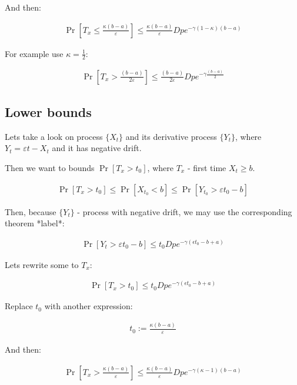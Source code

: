 \documentclass[12pt, a4paper]{article}
\theoremstyle{remark}
\begin{document}
And then:

\begin{align*}
    \Pr\left[T_x \leq \frac{\kappa (b - a)}{\varepsilon}\right] \leq \frac{\kappa (b - a)}{\varepsilon} D p e^{-\gamma(1 - \kappa)(b - a)}
\end{align*}

For example use $\kappa = \frac{1}{2}$:

\begin{align*}
    \Pr\left[T_x > \frac{(b - a)}{2\varepsilon}\right] \leq \frac{(b - a)}{2\varepsilon} D p e^{-\gamma\frac{(b - a)}{2}}
\end{align*}
\subsection{Lower bounds}
Lets take a look on process $\{X_t\}$ and its derivative process $\{Y_t\}$, where $Y_t = \varepsilon t - X_t$ and it has negative drift.

Then we want to bounds $\Pr[T_x > t_0]$, where $T_x$ - first time $X_t \geq b$. 

\begin{align*}
    \Pr[T_x > t_0] \leq \Pr[X_{t_0} < b] \leq \Pr[Y_{t_0} > \varepsilon t_0 - b]
\end{align*}

Then, because $\{Y_t\}$ - process with negative drift, we may use the corresponding theorem *label*:

\begin{align*}
    \Pr[Y_t > \varepsilon t_0 - b] \leq t_0 D p e^{-\gamma(\epsilon t_0 - b + a)}
\end{align*}

Lets rewrite some to $T_x$: 

\begin{align*}
    \Pr[T_x > t_0] \leq t_0 D p e^{-\gamma(\epsilon t_0 - b + a)}
\end{align*}

Replace $t_0$ with another expression:

\begin{align*}
    t_0 := \frac{\kappa (b - a)}{\varepsilon}
\end{align*}

And then:

\begin{align*}
    \Pr\left[T_x > \frac{\kappa (b - a)}{\varepsilon}\right] \leq \frac{\kappa (b - a)}{\varepsilon} D p e^{-\gamma(\kappa - 1)(b - a)}
\end{align*}
\end{document}
